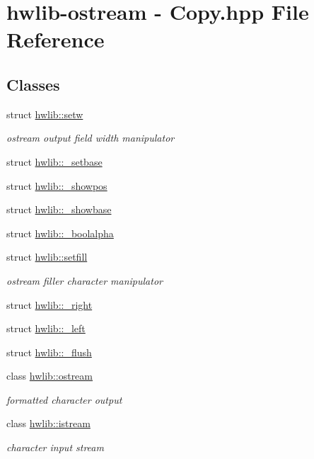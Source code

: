 \hypertarget{hwlib-ostream_01-_01_copy_8hpp}{}\section{hwlib-\/ostream -\/ Copy.\+hpp File Reference}
\label{hwlib-ostream_01-_01_copy_8hpp}
\subsection*{Classes}
\begin{DoxyCompactItemize}
\item 
struct \hyperlink{structhwlib_1_1setw}{hwlib\+::setw}
\begin{DoxyCompactList}\small\item\em ostream output field width manipulator \end{DoxyCompactList}\item 
struct \hyperlink{structhwlib_1_1__setbase}{hwlib\+::\+\_\+setbase}
\item 
struct \hyperlink{structhwlib_1_1__showpos}{hwlib\+::\+\_\+showpos}
\item 
struct \hyperlink{structhwlib_1_1__showbase}{hwlib\+::\+\_\+showbase}
\item 
struct \hyperlink{structhwlib_1_1__boolalpha}{hwlib\+::\+\_\+boolalpha}
\item 
struct \hyperlink{structhwlib_1_1setfill}{hwlib\+::setfill}
\begin{DoxyCompactList}\small\item\em ostream filler character manipulator \end{DoxyCompactList}\item 
struct \hyperlink{structhwlib_1_1__right}{hwlib\+::\+\_\+right}
\item 
struct \hyperlink{structhwlib_1_1__left}{hwlib\+::\+\_\+left}
\item 
struct \hyperlink{structhwlib_1_1__flush}{hwlib\+::\+\_\+flush}
\item 
class \hyperlink{classhwlib_1_1ostream}{hwlib\+::ostream}
\begin{DoxyCompactList}\small\item\em formatted character output \end{DoxyCompactList}\item 
class \hyperlink{classhwlib_1_1istream}{hwlib\+::istream}
\begin{DoxyCompactList}\small\item\em character input stream \end{DoxyCompactList}\end{DoxyCompactItemize}
